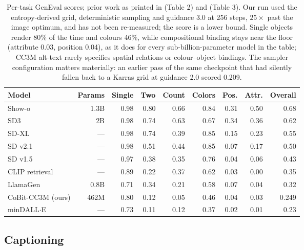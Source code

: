 \begin{table}[tb]
\centering
\small
\begin{tabular}{lrrrrrrrr}
\toprule
\textbf{Model} & \textbf{Params} & Single & Two & Count & Colors & Pos. & Attr. & \textbf{Overall} \\
\midrule
Show-o \citep{image:showo} & 1.3B & 0.98 & 0.80 & 0.66 & 0.84 & 0.31 & 0.50 & 0.68 \\
SD3 & 2B & 0.98 & 0.74 & 0.63 & 0.67 & 0.34 & 0.36 & 0.62 \\
SD-XL & --- & 0.98 & 0.74 & 0.39 & 0.85 & 0.15 & 0.23 & 0.55 \\
SD v2.1 & --- & 0.98 & 0.51 & 0.44 & 0.85 & 0.07 & 0.17 & 0.50 \\
SD v1.5 & --- & 0.97 & 0.38 & 0.35 & 0.76 & 0.04 & 0.06 & 0.43 \\
CLIP retrieval & --- & 0.89 & 0.22 & 0.37 & 0.62 & 0.03 & 0.00 & 0.35 \\
LlamaGen & 0.8B & 0.71 & 0.34 & 0.21 & 0.58 & 0.07 & 0.04 & 0.32 \\
CoBit-CC3M (ours) & 462M & 0.80 & 0.12 & 0.05 & 0.46 & 0.04 & 0.03 & 0.249 \\
minDALL$\cdot$E & --- & 0.73 & 0.11 & 0.12 & 0.37 & 0.02 & 0.01 & 0.23 \\
\bottomrule
\end{tabular}
\caption{Per-task GenEval scores; prior work as printed in \citet{image:geneval} (Table 2) and
\citet{image:showo} (Table 3). Our run used the entropy-derived grid, deterministic sampling and
guidance 3.0 at 256 steps, $25\times$ past the image optimum, and has not been re-measured; the
score is a lower bound. Single objects render 80\% of the time and colours 46\%, while
compositional binding stays near the floor (attribute 0.03, position 0.04), as it does for every
sub-billion-parameter model in the table; CC3M alt-text rarely specifies spatial relations or
colour--object bindings. The sampler configuration matters materially: an earlier pass of the same
checkpoint that had silently fallen back to a Karras grid at guidance 2.0 scored 0.209.}
\label{tab:app:image:geneval}
\end{table}

\subsection{Captioning}
\label{app:image:captioning}

